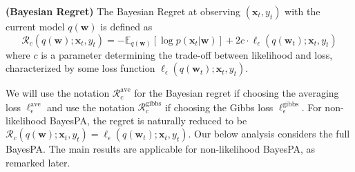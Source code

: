 \documentclass[twoside,11pt]{article}
\newcommand{\xv}{\bm{x}}
\newcommand{\regret}{\mathcal{R}}
\newcommand{\wv}{\bm{w}}
\newcommand{\ep}{\mathbb{E}}
\begin{document}
{\begin{definition}
\textbf{(Bayesian Regret)} The Bayesian Regret at observing $(\xv_t, y_t)$ with the current model $q(\wv)$ is defined as
\begin{equation}
\mathcal{R}_c(q(\wv); \xv_t, y_t) = -\ep_{q(\wv)}[\log p(\xv_t | \wv)]+2 c \cdot \ell_\epsilon(q(\wv_t); \xv_t, y_t)
\end{equation}
where $c$ is a parameter determining the trade-off between likelihood and loss, characterized by some loss function $\ell_\epsilon(q(\wv_t); \xv_t, y_t)$.
\end{definition}
We will use the notation $\regret_c^\text{ave}$ for the Bayesian regret if choosing the averaging loss $\ell_\epsilon^\text{ave}$ and use the notation $\regret_c^\text{gibbs}$ if choosing the Gibbs loss $\ell_\epsilon^\text{gibbs}$. For non-likelihood BayesPA, the regret is naturally reduced to be $\mathcal{R}_c(q(\wv); \xv_t, y_t) = \ell_\epsilon(q(\wv_t); \xv_t, y_t)$. Our below analysis considers the full BayesPA. The main results are applicable for non-likelihood BayesPA, as remarked later.

}
\end{document}
